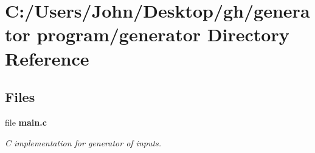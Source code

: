\section{C\+:/\+Users/\+John/\+Desktop/gh/generator program/generator Directory Reference}
\label{dir_2afea94ac0f9d61edcffab48f801cefd}
\subsection*{Files}
\begin{DoxyCompactItemize}
\item 
file \textbf{ main.\+c}
\begin{DoxyCompactList}\small\item\em C implementation for generator of inputs. \end{DoxyCompactList}\end{DoxyCompactItemize}
